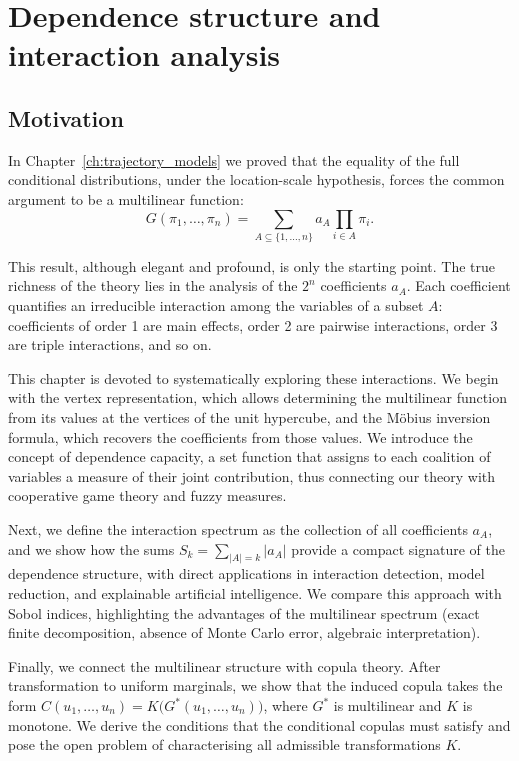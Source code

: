 \startcontents[chapter]
\chapter{Dependence structure and interaction analysis}
\label{ch:dependence_structure}
\minitocboxed

\section*{Motivation}

In Chapter~\ref{ch:trajectory_models} we proved that the equality of the full conditional distributions, under the location-scale hypothesis, forces the common argument to be a multilinear function:
\[
G(\pi_1,\ldots,\pi_n) = \sum_{A\subseteq\{1,\ldots,n\}} a_A \prod_{i\in A} \pi_i.
\]

This result, although elegant and profound, is only the starting point. The true richness of the theory lies in the analysis of the \(2^n\) coefficients \(a_A\). Each coefficient quantifies an irreducible interaction among the variables of a subset \(A\): coefficients of order 1 are main effects, order 2 are pairwise interactions, order 3 are triple interactions, and so on.

This chapter is devoted to systematically exploring these interactions. We begin with the vertex representation, which allows determining the multilinear function from its values at the vertices of the unit hypercube, and the Möbius inversion formula, which recovers the coefficients from those values. We introduce the concept of dependence capacity, a set function that assigns to each coalition of variables a measure of their joint contribution, thus connecting our theory with cooperative game theory and fuzzy measures.

Next, we define the interaction spectrum as the collection of all coefficients \(a_A\), and we show how the sums \(S_k = \sum_{|A|=k}|a_A|\) provide a compact signature of the dependence structure, with direct applications in interaction detection, model reduction, and explainable artificial intelligence. We compare this approach with Sobol indices, highlighting the advantages of the multilinear spectrum (exact finite decomposition, absence of Monte Carlo error, algebraic interpretation).

Finally, we connect the multilinear structure with copula theory. After transformation to uniform marginals, we show that the induced copula takes the form \(C(u_1,\ldots,u_n)=K\bigl(G^*(u_1,\ldots,u_n)\bigr)\), where \(G^*\) is multilinear and \(K\) is monotone. We derive the conditions that the conditional copulas must satisfy and pose the open problem of characterising all admissible transformations \(K\).

